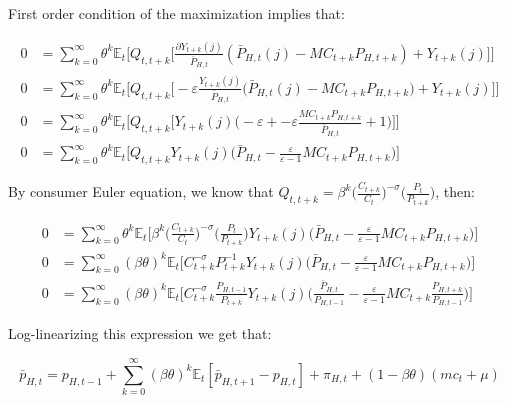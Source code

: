 \documentclass{article}
\newcommand{\Et}{\mathbb{E}_t}
\begin{document}
First order condition of the maximization implies that:

\begin{equation*}
    \begin{split}
        0 &= \sum^\infty_{k=0} \theta^k \Et \bigg[ Q_{t, t+k} \Big[ \frac{\partial Y_{t+k}(j)}{\bar P_{H,t}} (\bar P_{H,t}(j) - MC_{t+k} P_{H,t+k}) + Y_{t+k}(j)  \Big] \bigg]\\
        0 &= \sum^\infty_{k=0} \theta^k \Et \bigg[ Q_{t, t+k} \Big[ -\varepsilon \frac{Y_{t+k}(j)}{\bar P_{H,t}} \Big(\bar P_{H,t}(j) - MC_{t+k} P_{H,t+k} \Big) + Y_{t+k}(j)  \Big] \bigg]\\
        0 &= \sum^\infty_{k=0} \theta^k \Et \bigg[ Q_{t, t+k} \Big[ Y_{t+k}(j) \Big(-\varepsilon  + -\varepsilon\frac{MC_{t+k} P_{H,t+k}}{\bar P_{H,t}} +1 \Big) \Big] \bigg] \\
        0 &= \sum^\infty_{k=0} \theta^k \Et \bigg[ Q_{t, t+k} Y_{t+k}(j) \Big(\bar P_{H,t} - \frac{\varepsilon}{\varepsilon-1} MC_{t+k} P_{H,t+k} \Big) \bigg]
    \end{split}
\end{equation*}


By consumer Euler equation, we know that $Q_{t, t+k} = \beta^k \Big( \frac{C_{t+k}}{C_t} \Big)^{-\sigma} \Big( \frac{P_{t}}{P_{t+k}} \Big)$, then:

\begin{equation*}
    \begin{split}
        0 &= \sum^\infty_{k=0} \theta^k \Et \bigg[ \beta^k \Big( \frac{C_{t+k}}{C_t} \Big)^{-\sigma} \Big( \frac{P_t}{P_{t+k}} \Big) Y_{t+k}(j) \Big(\bar P_{H,t} - \frac{\varepsilon}{\varepsilon-1} MC_{t+k} P_{H,t+k} \Big) \bigg] \\
        0 &= \sum^\infty_{k=0} (\beta\theta)^k \Et \bigg[ C_{t+k}^{-\sigma} P_{t+k}^{-1}  Y_{t+k}(j) \Big(\bar P_{H,t} - \frac{\varepsilon}{\varepsilon-1} MC_{t+k} P_{H,t+k} \Big) \bigg] \\
        0 &= \sum^\infty_{k=0} (\beta\theta)^k \Et \bigg[ C_{t+k}^{-\sigma} \frac{P_{H, t-1}}{P_{t+k}}  Y_{t+k}(j) \Big(\frac{\bar P_{H,t}}{P_{H,t-1}} - \frac{\varepsilon}{\varepsilon-1} MC_{t+k} \frac{P_{H,t+k}}{P_{H,t-1}} \Big) \bigg]
    \end{split}
\end{equation*}


Log-linearizing this expression we get that:

$$\bar p_{H,t} = p_{H,t-1} + \sum^\infty_{k=0} (\beta \theta)^k \Et[\bar p_{H,t+1} - p_{H, t}] + \pi_{H, t} + (1- \beta \theta)(mc_t + \mu)$$
\end{document}
